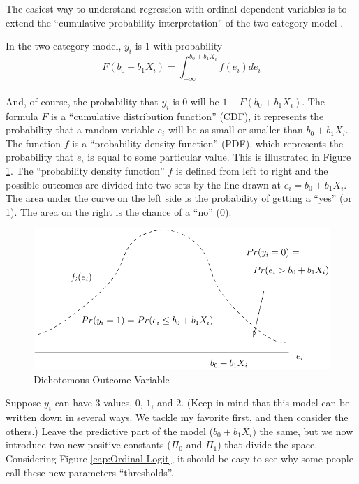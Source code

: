 The easiest way to understand regression with ordinal dependent variables
is to extend the ``cumulative probability interpretation'' of the
two category model \citep{pinheiro_mixed-effects_2000}. 

In the two category model, $y_{i}$ is 1 with probability 
\begin{equation}
F(b_{0}+b_{1}X_{i})=\int_{-\infty}^{b_{0}+b_{1}X_{i}}f(e_{i})de_{i}
\end{equation}
\\
And, of course, the probability that $y_{i}$ is 0 will be $1-F(b_{0}+b_{1}X_{i}).$
The formula $F$ is a ``cumulative distribution function'' (CDF),
it represents the probability that a random variable $e_{i}$ will
be as small or smaller than $b_{0}+b_{1}X_{i}$. The function $f$
is a ``probability density function'' (PDF), which represents the
probability that $e_{i}$ is equal to some particular value. This
is illustrated in Figure \ref{fig:Dichotomous}. The ``probability
density function'' $f$ is defined from left to right and the possible
outcomes are divided into two sets by the line drawn at $e_{i}=b_{0}+b_{1}X_{i}$.
The area under the curve on the left side is the probability of getting
a ``yes'' (or 1). The area on the right is the chance of a ``no''
(0).

\begin{figure}
\begin{centering}
\includegraphics{Chapter1/ordinal-fig-1}
\par\end{centering}

\caption{Dichotomous Outcome Variable\label{fig:Dichotomous}}
\end{figure}


Suppose $y_{i}$ can have $3$ values, $0$, $1$, and $2$. (Keep
in mind that this model can be written down in several ways. We tackle
my favorite first, and then consider the others.) Leave the predictive
part of the model ($b_{0}+b_{1}X_{i})$ the same, but we now introduce
two new positive constants ($\Pi_{0}$ and $\Pi_{1}$) that divide
the space. Considering Figure \ref{cap:Ordinal-Logit}, it should
be easy to see why some people call these new parameters ``thresholds''. 


